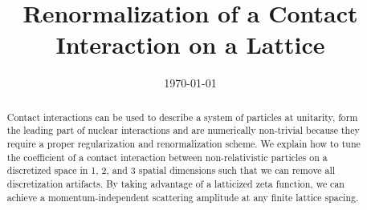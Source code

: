\documentclass[aps,superscriptaddress,tightenlines,nofootinbib,floatfix,longbibliography,notitlepage,10pt,pra]{revtex4-1}
\begin{document}
\title{Renormalization of a Contact Interaction on a Lattice}





\date{\today}

\begin{abstract}
Contact interactions can be used to describe a system of particles at unitarity, form the leading part of nuclear interactions and are numerically non-trivial because they require a proper regularization and renormalization scheme.
We explain how to tune the coefficient of a contact interaction between non-relativistic particles on a discretized space in 1, 2, and 3 spatial dimensions such that we can remove all discretization artifacts.
By taking advantage of a latticized \Luscher zeta function, we can achieve a momentum-independent scattering amplitude at any finite lattice spacing.
\end{abstract}

\maketitle





    \FloatBarrier
       \FloatBarrier
      \FloatBarrier
% 



\appendix






\end{document}
